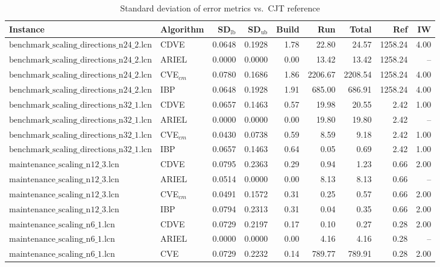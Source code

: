 \begin{table}[ht]
\centering
\scriptsize
\caption{Standard deviation of error metrics vs.\ CJT reference}
\begin{tabular}{llrrrrrrr}
\toprule
Instance & Algorithm & SD$_{\text{lb}}$ & SD$_{\text{ub}}$ & Build & Run & Total & Ref & IW \\
\midrule
$\text{benchmark\_scaling\_directions\_n24\_2.lcn}$ & CDVE & 0.0648 & 0.1928 & 1.78 & 22.80 & 24.57 & 1258.24 & 4.00 \\
$\text{benchmark\_scaling\_directions\_n24\_2.lcn}$ & ARIEL & 0.0000 & 0.0000 & 0.00 & 13.42 & 13.42 & 1258.24 & -- \\
$\text{benchmark\_scaling\_directions\_n24\_2.lcn}$ & CVE$_{cm}$ & 0.0780 & 0.1686 & 1.86 & 2206.67 & 2208.54 & 1258.24 & 4.00 \\
$\text{benchmark\_scaling\_directions\_n24\_2.lcn}$ & IBP & 0.0648 & 0.1928 & 1.91 & 685.00 & 686.91 & 1258.24 & 4.00 \\
\hline
$\text{benchmark\_scaling\_directions\_n32\_1.lcn}$ & CDVE & 0.0657 & 0.1463 & 0.57 & 19.98 & 20.55 & 2.42 & 1.00 \\
$\text{benchmark\_scaling\_directions\_n32\_1.lcn}$ & ARIEL & 0.0000 & 0.0000 & 0.00 & 19.80 & 19.80 & 2.42 & -- \\
$\text{benchmark\_scaling\_directions\_n32\_1.lcn}$ & CVE$_{cm}$ & 0.0430 & 0.0738 & 0.59 & 8.59 & 9.18 & 2.42 & 1.00 \\
$\text{benchmark\_scaling\_directions\_n32\_1.lcn}$ & IBP & 0.0657 & 0.1463 & 0.64 & 0.05 & 0.69 & 2.42 & 1.00 \\
\hline
$\text{maintenance\_scaling\_n12\_3.lcn}$ & CDVE & 0.0795 & 0.2363 & 0.29 & 0.94 & 1.23 & 0.66 & 2.00 \\
$\text{maintenance\_scaling\_n12\_3.lcn}$ & ARIEL & 0.0514 & 0.0000 & 0.00 & 8.13 & 8.13 & 0.66 & -- \\
$\text{maintenance\_scaling\_n12\_3.lcn}$ & CVE$_{cm}$ & 0.0491 & 0.1572 & 0.31 & 0.25 & 0.57 & 0.66 & 2.00 \\
$\text{maintenance\_scaling\_n12\_3.lcn}$ & IBP & 0.0794 & 0.2313 & 0.31 & 0.04 & 0.35 & 0.66 & 2.00 \\
\hline
$\text{maintenance\_scaling\_n6\_1.lcn}$ & CDVE & 0.0729 & 0.2197 & 0.17 & 0.10 & 0.27 & 0.28 & 2.00 \\
$\text{maintenance\_scaling\_n6\_1.lcn}$ & ARIEL & 0.0000 & 0.0000 & 0.00 & 4.16 & 4.16 & 0.28 & -- \\
$\text{maintenance\_scaling\_n6\_1.lcn}$ & CVE & 0.0729 & 0.2232 & 0.14 & 789.77 & 789.91 & 0.28 & 2.00 \\

\end{tabular}
\end{table}

